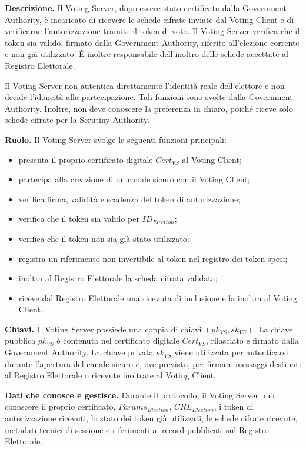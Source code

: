 \documentclass[a4paper,12pt]{article}
\begin{document}
\textbf{Descrizione.}
Il Voting Server, dopo essere stato certificato dalla Government Authority, \`e incaricato di ricevere le schede cifrate inviate dal Voting Client e di verificarne l'autorizzazione tramite il token di voto.
Il Voting Server verifica che il token sia valido, firmato dalla Government Authority, riferito all'elezione corrente e non gi\`a utilizzato.
\`E inoltre responsabile dell'inoltro delle schede accettate al Registro Elettorale.

Il Voting Server non autentica direttamente l'identit\`a reale dell'elettore e non decide l'idoneit\`a alla partecipazione.
Tali funzioni sono svolte dalla Government Authority.
Inoltre, non deve conoscere la preferenza in chiaro, poich\'e riceve solo schede cifrate per la Scrutiny Authority.

\textbf{Ruolo.}
Il Voting Server svolge le seguenti funzioni principali:

\begin{itemize}
	\item presenta il proprio certificato digitale \(Cert_{VS}\) al Voting Client;
	\item partecipa alla creazione di un canale sicuro con il Voting Client;
	\item verifica firma, validit\`a e scadenza del token di autorizzazione;
	\item verifica che il token sia valido per \(ID_{Election}\);
	\item verifica che il token non sia gi\`a stato utilizzato;
	\item registra un riferimento non invertibile al token nel registro dei token spesi;
	\item inoltra al Registro Elettorale la scheda cifrata validata;
	\item riceve dal Registro Elettorale una ricevuta di inclusione e la inoltra al Voting Client.
\end{itemize}

\textbf{Chiavi.}
Il Voting Server possiede una coppia di chiavi \((pk_{VS}, sk_{VS})\).
La chiave pubblica \(pk_{VS}\) \`e contenuta nel certificato digitale \(Cert_{VS}\), rilasciato e firmato dalla Government Authority.
La chiave privata \(sk_{VS}\) viene utilizzata per autenticarsi durante l'apertura del canale sicuro e, ove previsto, per firmare messaggi destinati al Registro Elettorale o ricevute inoltrate al Voting Client.

\textbf{Dati che conosce e gestisce.}
Durante il protocollo, il Voting Server pu\`o conoscere il proprio certificato, \(Params_{Election}\), \(CRL_{Election}\), i token di autorizzazione ricevuti, lo stato dei token gi\`a utilizzati, le schede cifrate ricevute, metadati tecnici di sessione e riferimenti ai record pubblicati sul Registro Elettorale.
\end{document}

